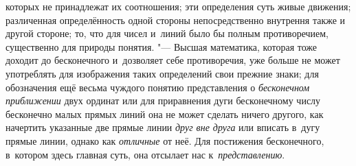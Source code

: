которых не принадлежат их соотношения; эти определения суть живые движения;
различенная определённость одной стороны непосредственно внутрення также и
другой стороне; то, что для чисел и~линий было бы полным
противоречием, существенно для природы понятия. "--- Высшая
математика, которая тоже доходит до бесконечного и~дозволяет себе
противоречия, уже больше не может употреблять для изображения таких
определений свои прежние знаки; для обозначения ещё весьма чуждого понятию
представления о {\em бесконечном приближении} двух ординат или для приравнения
дуги бесконечному числу бесконечно малых прямых линий она не может сделать
ничего другого, как начертить указанные две прямые линии {\em друг вне друга}
или вписать в~дугу прямые линии, однако как {\em отличные} от неё. Для
постижения бесконечного, в~котором здесь главная суть, она отсылает нас
к~{\em представлению}.


